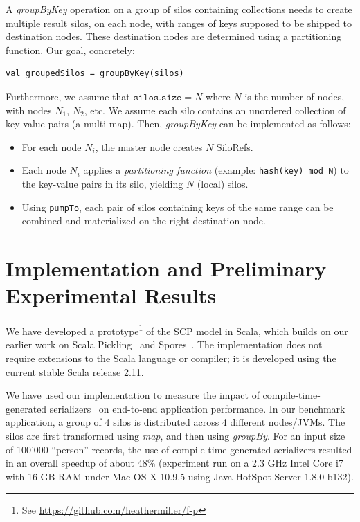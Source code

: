 \documentclass{easychair}
\begin{document}
A \emph{groupByKey} operation on a group of silos containing collections needs to create multiple result silos, on each node, with ranges of keys supposed to be shipped to destination nodes. These destination nodes are determined using a partitioning function. Our goal, concretely:
\begin{verbatim}
val groupedSilos = groupByKey(silos)
\end{verbatim}
\noindent
Furthermore, we assume that $\texttt{silos.size} = N$ where $N$ is the number of nodes,
with nodes $N_1$, $N_2$, etc. We assume each silo contains an unordered collection
of key-value pairs (a multi-map). Then, \emph{groupByKey} can be implemented as
follows:
\begin{itemize}
\item For each node $N_i$, the master node creates $N$ SiloRefs.
\item Each node $N_i$ applies a \emph{partitioning function} (example: \verb|hash(key) mod N|) to
      the key-value pairs in its silo, yielding $N$ (local) silos.
\item Using \verb|pumpTo|, each pair of silos containing keys of the same range can be combined
      and materialized on the right destination node.
\end{itemize}



\section{Implementation and Preliminary Experimental Results}
\label{sec:impl}

We have developed a prototype\footnote{See \url{https://github.com/heathermiller/f-p}}
of the SCP model in Scala, which builds on our earlier work on
Scala Pickling~\cite{MillerHBO13} and Spores~\cite{MillerHO14}.
The implementation does not require extensions to the Scala language or compiler; it
is developed using the current stable Scala release 2.11.

We have used our implementation to measure the impact of
compile-time-generated serializers~\cite{MillerHBO13} on end-to-end application
performance. In our benchmark application, a group of 4 silos is distributed
across 4 different nodes/JVMs. The silos are first transformed using
\emph{map}, and then using \emph{groupBy}. For an input size of 100'000 ``person''
records, the use of compile-time-generated serializers resulted in
an overall speedup of about 48\% (experiment run on a 2.3 GHz Intel Core i7
with 16 GB RAM under Mac OS X 10.9.5 using Java HotSpot Server 1.8.0-b132).
\end{document}
